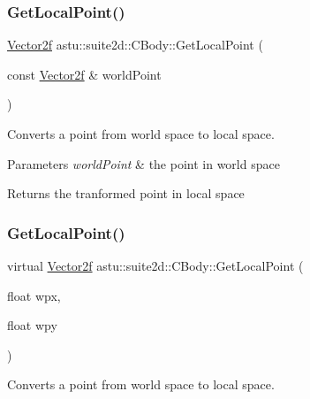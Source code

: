 \subsubsection{\texorpdfstring{Get\+Local\+Point()}{GetLocalPoint()}\hspace{0.1cm}{\footnotesize\ttfamily [1/2]}}
{\footnotesize\ttfamily \hyperlink{classastu_1_1Vector2}{Vector2f} astu\+::suite2d\+::\+C\+Body\+::\+Get\+Local\+Point (\begin{DoxyParamCaption}\item[{const \hyperlink{classastu_1_1Vector2}{Vector2f} \&}]{world\+Point }\end{DoxyParamCaption})\hspace{0.3cm}{\ttfamily [inline]}}

Converts a point from world space to local space.


\begin{DoxyParams}{Parameters}
{\em world\+Point} & the point in world space \\
\hline
\end{DoxyParams}
\begin{DoxyReturn}{Returns}
the tranformed point in local space 
\end{DoxyReturn}
\mbox{\label{classastu_1_1suite2d_1_1CBody_ab8945dc57ee548799613860ebac8b87c}} 
\subsubsection{\texorpdfstring{Get\+Local\+Point()}{GetLocalPoint()}\hspace{0.1cm}{\footnotesize\ttfamily [2/2]}}
{\footnotesize\ttfamily virtual \hyperlink{classastu_1_1Vector2}{Vector2f} astu\+::suite2d\+::\+C\+Body\+::\+Get\+Local\+Point (\begin{DoxyParamCaption}\item[{float}]{wpx,  }\item[{float}]{wpy }\end{DoxyParamCaption})\hspace{0.3cm}{\ttfamily [pure virtual]}}

Converts a point from world space to local space.


